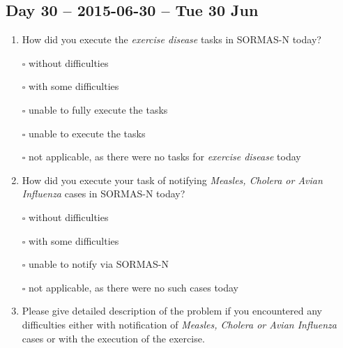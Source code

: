 \documentclass[a4paper, titlepage]{tufte-handout}
\begin{document}
\subsection{Day 30 -- 2015-06-30 -- Tue 30 Jun}
\label{sec-8-22}
\begin{enumerate}
\item How did you execute the \emph{exercise disease} tasks in SORMAS-N today?

\quad $\square$ without difficulties

\quad $\square$ with some difficulties

\quad $\square$ unable to fully execute the tasks

\quad $\square$ unable to execute the tasks

\quad $\square$ not applicable, as there were no tasks for \emph{exercise disease} today

\item How did you execute your task of notifying \emph{Measles, Cholera or Avian Influenza} cases in SORMAS-N today?

\quad $\square$ without difficulties

\quad $\square$ with some difficulties

\quad $\square$ unable to notify via SORMAS-N

\quad $\square$ not applicable, as there were no such cases today

\item Please give detailed description of the problem if you encountered any difficulties either with notification of \emph{Measles, Cholera or Avian Influenza} cases or with the execution of the exercise.

\hrulefill

\hrulefill

\hrulefill

\hrulefill

\hrulefill

\hrulefill

\hrulefill

\hrulefill

\hrulefill

\hrulefill
\end{enumerate}

\newpage
\end{document}

